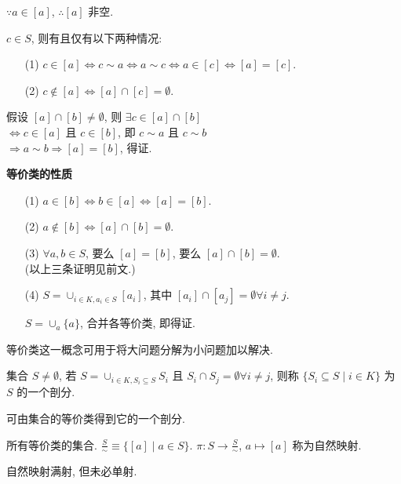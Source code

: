\documentclass{note}
\begin{document}
$\because a\in[a]$, $\therefore[a]$ 非空.

$c\in S$, 则有且仅有以下两种情况:
\begin{itemize}
    \item[(1)] $c\in[a]\Longleftrightarrow c\sim a\Longleftrightarrow a\sim c\Longleftrightarrow a\in[c]\Longleftrightarrow[a]=[c]$.
    \item[(2)] $c\notin[a]\Longleftrightarrow[a]\cap[c]=\emptyset$.
\end{itemize}
\begin{pf}
    假设 $[a]\cap[b]\neq\emptyset$, 则 $\exists c\in[a]\cap[b]$\\
    $\Longleftrightarrow c\in[a]$ 且 $c\in[b]$, 即 $c\sim a$ 且 $c\sim b$\\
    $\Longrightarrow a\sim b\Longrightarrow[a]=[b]$, 得证.
\end{pf}

\textbf{等价类的性质}
\begin{itemize}
    \item[(1)] $a\in[b]\Longleftrightarrow b\in[a]\Longleftrightarrow[a]=[b]$.
    \item[(2)] $a\notin[b]\Longleftrightarrow[a]\cap[b]=\emptyset$.
    \item[(3)] $\forall a,b\in S$, 要么 $[a]=[b]$, 要么 $[a]\cap[b]=\emptyset$.\\
    (以上三条证明见前文.)
    \item[(4)] $S=\cup_{i\in K,a_i\in S}[a_i]$, 其中 $[a_i]\cap[a_j]=\emptyset\forall i\neq j$.
    \begin{pf}
        $S=\cup_a\{a\}$, 合并各等价类, 即得证.
    \end{pf}
\end{itemize}

等价类这一概念可用于将大问题分解为小问题加以解决.

\begin{df}[剖分]
    集合 $S\neq\emptyset$, 若 $S=\cup_{i\in K,S_i\subseteq S}S_i$ 且 $S_i\cap S_j=\emptyset\forall i\neq j$, 则称 $\{S_i\subseteq S\mid i\in K\}$ 为 $S$ 的一个剖分.
\end{df}

可由集合的等价类得到它的一个剖分.

\begin{df}[商类]
    所有等价类的集合. $\frac{S}{\sim}\equiv\{[a]\mid a\in S\}$. $\pi: S\rightarrow\frac{S}{\sim}$, $a\mapsto[a]$ 称为自然映射.
\end{df}

自然映射满射, 但未必单射.
\end{document}

